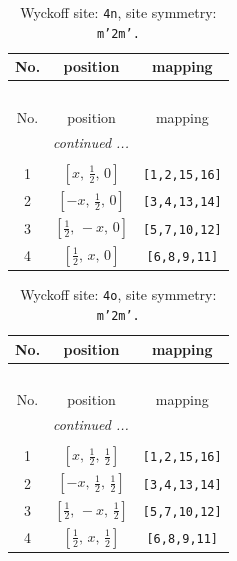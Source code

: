 \documentclass[fleqn,8pt]{jsarticle}
\begin{document}
\renewcommand{\arraystretch}{1.2}
\begin{longtable}{ccc}
\caption{Wyckoff site: {\tt 4n}, site symmetry: {\tt m'2m'.}}
 \\
 \hline \hline
No. & position & mapping \\ \hline \endfirsthead

\multicolumn{2}{l}{\tablename\ \thetable{}} \\
 \hline \hline
No. & position & mapping \\ \hline \endhead

 \hline \hline
\multicolumn{2}{r}{\footnotesize\it continued ...} \\ \endfoot

 \hline \hline
\multicolumn{2}{r}{} \\ \endlastfoot

1 & $\left[ x,\, \frac{1}{2},\, 0 \right]$ & {\tt [1,2,15,16]} \\ \hline
2 & $\left[ - x,\, \frac{1}{2},\, 0 \right]$ & {\tt [3,4,13,14]} \\ \hline
3 & $\left[ \frac{1}{2},\, - x,\, 0 \right]$ & {\tt [5,7,10,12]} \\ \hline
4 & $\left[ \frac{1}{2},\, x,\, 0 \right]$ & {\tt [6,8,9,11]} \\
\end{longtable}
\renewcommand{\arraystretch}{1.2}
\begin{longtable}{ccc}
\caption{Wyckoff site: {\tt 4o}, site symmetry: {\tt m'2m'.}}
 \\
 \hline \hline
No. & position & mapping \\ \hline \endfirsthead

\multicolumn{2}{l}{\tablename\ \thetable{}} \\
 \hline \hline
No. & position & mapping \\ \hline \endhead

 \hline \hline
\multicolumn{2}{r}{\footnotesize\it continued ...} \\ \endfoot

 \hline \hline
\multicolumn{2}{r}{} \\ \endlastfoot

1 & $\left[ x,\, \frac{1}{2},\, \frac{1}{2} \right]$ & {\tt [1,2,15,16]} \\ \hline
2 & $\left[ - x,\, \frac{1}{2},\, \frac{1}{2} \right]$ & {\tt [3,4,13,14]} \\ \hline
3 & $\left[ \frac{1}{2},\, - x,\, \frac{1}{2} \right]$ & {\tt [5,7,10,12]} \\ \hline
4 & $\left[ \frac{1}{2},\, x,\, \frac{1}{2} \right]$ & {\tt [6,8,9,11]} \\
\end{longtable}
\end{document}
